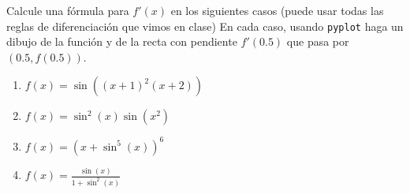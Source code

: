 \documentclass[12pt, a4paper]{article}
\begin{document}


\item Calcule una fórmula para $f'(x)$ en los siguientes casos (puede usar todas las reglas de diferenciación que vimos en clase)  En cada caso, usando \verb!pyplot! haga un dibujo de la funci\'on y de la recta con pendiente $f'(0.5)$ que pasa por $(0.5,f(0.5))$.
\begin{enumerate}
\item $f(x)=\sin((x+1)^2(x+2))$
\item $f(x)=\sin^2(x)\sin(x^2)$
\item $f(x)=(x+\sin^5(x))^6$
\item $f(x)=\frac{\sin(x)}{1+\sin^2(x)}$
\end{enumerate}
\end{document}
